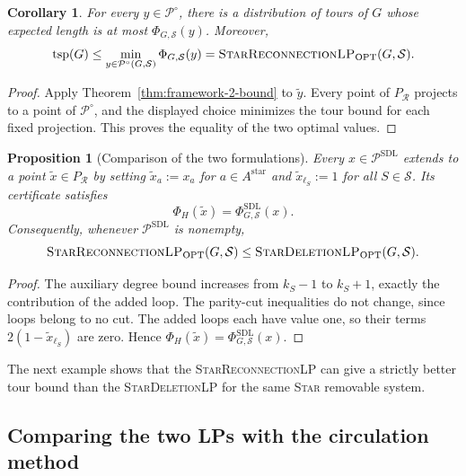 \documentclass[11pt]{amsart}
\newcommand{\1}{\mathbbm{1}}
\newcommand{\LPone}{\textsc{StarDeletionLP}}
\newcommand{\LPtwo}{\textsc{StarReconnectionLP}}
\newcommand{\Pone}{\mathcal P^{\mathrm{SDL}}}
\newcommand{\PhiOne}{\Phi^{\mathrm{SDL}}}
\newtheorem{corollary}[theorem]{Corollary}
\newtheorem{proposition}[theorem]{Proposition}
\begin{document}
\begin{corollary}\label{cor:repair-nonloop-bound}
For every $y\in{\mathcal P^\circ}$, there is a distribution of tours
of $G$ whose expected length is at most $\Phi_{G,\mathcal S}(y)$.
Moreover,
\[
 \operatorname{tsp}(G)
 \le\min_{y\in{\mathcal P^\circ}(G,\mathcal S)}\Phi_{G,\mathcal S}(y)
 =\text{\LPtwo}_{\mathrm{OPT}}(G,\mathcal S).
\]
\end{corollary}
\begin{proof}
Apply Theorem~\ref{thm:framework-2-bound} to $\widetilde y$.
Every point of ${P_{\mathcal R}}$ projects to a point of
${\mathcal P^\circ}$, and the displayed choice minimizes the tour
bound for each fixed projection. This proves the equality of
the two optimal values.
\end{proof}

\begin{proposition}[Comparison of the two formulations]
\label{prop:framework-containment}
Every $x\in \Pone$ extends to a point $\widetilde x\in {P_{\mathcal R}}$ by setting
$\widetilde x_a:=x_a$ for $a\in A^{\mathrm{star}}$ and $\widetilde x_{\ell_S}:=1$ for
all $S\in\mathcal S$. Its certificate satisfies
\[
 \Phi_H(\widetilde x)=\PhiOne_{G,\mathcal S}(x).
\]
Consequently, whenever $\Pone$ is nonempty,
\[
 \text{\LPtwo}_{\mathrm{OPT}}(G,\mathcal S)
 \le \text{\LPone}_{\mathrm{OPT}}(G,\mathcal S).
\]
\end{proposition}
\begin{proof}
The auxiliary degree bound increases from $k_S-1$ to $k_S+1$,
exactly the contribution of the added loop. The parity-cut
inequalities do not change, since loops belong to no cut. The
added loops each have value one, so their terms
$2(1-\widetilde x_{\ell_S})$ are zero. Hence
$\Phi_H(\widetilde x)=\PhiOne_{G,\mathcal S}(x)$.
\end{proof}


The next example shows that the \LPtwo{} can give a strictly better
tour bound than the \LPone{} for the same \textsc{Star} removable system.






\subsection{Comparing the two LPs with the circulation method}
\label{subsec:four-vertex-separation}
\end{document}
